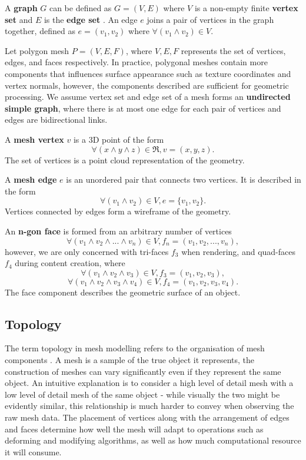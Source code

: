 \documentclass[ %
author={Dillon Keith Diep},
supervisor={Dr. Carl Henrik Ek},
degree={MEng},
title={ART-CG:},
subtitle={Assisted Real-time Content Generation of 3D Hair by Learning Manifolds},
type={Research},
year={2017} ]{dissertation}
\begin{document}
A \textbf{graph} $G$ can be defined as $G=(V,E)$ where $V$ is a non-empty finite \textbf{vertex set} and $E$ is the \textbf{edge set} \cite[p.8]{graphtheory}. An edge $e$ joins a pair of vertices in the graph together, defined as $e=(v_1, v_2)$ where $\forall(v_1 \land v_2)\in V$.

Let polygon mesh $P = (V, E, F)$, where $V, E, F$ represents the set of vertices, edges, and faces respectively. In practice, polygonal meshes contain more components that influences surface appearance such as texture coordinates and vertex normals, however, the components described are sufficient for geometric processing. We assume vertex set and edge set of a mesh forms an \textbf{undirected simple graph}, where there is at most one edge for each pair of vertices and edges are bidirectional links.

A \textbf{mesh vertex} $v$ is a 3D point of the form
$$\forall (x \land y \land z) \in \Re, v = (x, y, z).$$
The set of vertices is a point cloud representation of the geometry. 

A \textbf{mesh edge} $e$ is an unordered pair that connects two vertices. It is described in the form
$$\forall (v_1 \land v_2) \in V, e = \{v_1, v_2\}.$$
Vertices connected by edges form a wireframe of the geometry. 

An \textbf{n-gon face} is formed from an arbitrary number of vertices 
$$\forall (v_1 \land v_2 \land ... \land v_n) \in V, f_n = (v_1, v_2,..., v_n),$$ 
however, we are only concerned with tri-faces $f_3$ when rendering, and quad-faces $f_4$ during content creation, where
$$\forall (v_1 \land v_2 \land v_3) \in V, f_3 = (v_1, v_2, v_3),$$
$$\forall (v_1 \land v_2 \land v_3 \land v_4) \in V, f_4 = (v_1, v_2, v_3, v_4).$$
The face component describes the geometric surface of an object.

\subsection{Topology}
The term topology in mesh modelling refers to the organisation of mesh components \cite[p.91]{blenderstudio}. A mesh is a sample of the true object it represents, the construction of meshes can vary significantly even if they represent the same object. An intuitive explanation is to consider a high level of detail mesh with a low level of detail mesh of the same object - while visually the two might be evidently similar, this relationship is much harder to convey when observing the raw mesh data. The placement of vertices along with the arrangement of edges and faces determine how well the mesh will adapt to operations such as deforming and modifying algorithms, as well as how much computational resource it will consume.
\end{document}
